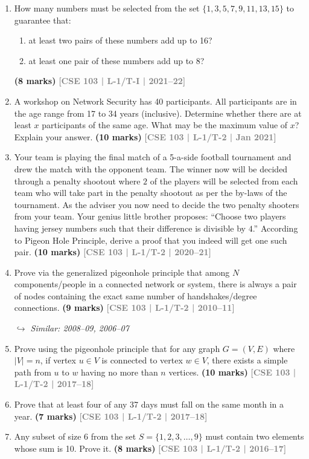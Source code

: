 \documentclass[12pt,a3paper]{article}
\newcommand{\yr}[1]{\hfill\textcolor{gray}{\small\textbf{[#1]}}}
\newcommand{\mk}[1]{\textcolor{orange!70!black}{\small\textbf{(#1 marks)}}}
\newcommand{\variant}[1]{\par\vspace{1pt}\textcolor{blue!50!black}%
  {\footnotesize\textit{$\hookrightarrow$ Similar: #1}}}
\begin{document}
\begin{enumerate}
\item How many numbers must be selected from the set $\{1, 3, 5, 7, 9, 11, 13, 15\}$ to guarantee that:
\begin{enumerate}
    \item at least two pairs of these numbers add up to 16?
    \item at least one pair of these numbers add up to 8?
\end{enumerate}
\mk{8} \yr{CSE 103 | L-1/T-I | 2021--22}

\item A workshop on Network Security has 40 participants. All participants are in the age range from 17 to 34 years (inclusive). Determine whether there are at least $x$ participants of the same age. What may be the maximum value of $x$? Explain your answer.
\mk{10} \yr{CSE 103 | L-1/T-2 | Jan 2021}

\item Your team is playing the final match of a 5-a-side football tournament and drew the match with the opponent team. The winner now will be decided through a penalty shootout where $2$ of the players will be selected from each team who will take part in the penalty shootout as per the by-laws of the tournament. As the adviser you now need to decide the two penalty shooters from your team. Your genius little brother proposes: ``Choose two players having jersey numbers such that their difference is divisible by $4$.'' According to Pigeon Hole Principle, derive a proof that you indeed will get one such pair.
\mk{10} \yr{CSE 103 | L-1/T-2 | 2020--21}

\item Prove via the generalized pigeonhole principle that among $N$ components/people in a connected network or system, there is always a pair of nodes containing the exact same number of handshakes/degree connections.
\mk{9} \yr{CSE 103 | L-1/T-2 | 2010--11} \variant{2008--09, 2006--07}

\item Prove using the pigeonhole principle that for any graph $G = (V, E)$ where $|V| = n$, if vertex $u \in V$ is connected to vertex $w \in V$, there exists a simple path from $u$ to $w$ having no more than $n$ vertices.
\mk{10} \yr{CSE 103 | L-1/T-2 | 2017--18}

\item Prove that at least four of any 37 days must fall on the same month in a year.
\mk{7} \yr{CSE 103 | L-1/T-2 | 2017--18}

\item Any subset of size 6 from the set $S = \{1, 2, 3, \ldots, 9\}$ must contain two elements whose sum is 10. Prove it.
\mk{8} \yr{CSE 103 | L-1/T-2 | 2016--17}


\end{enumerate}
\end{document}
